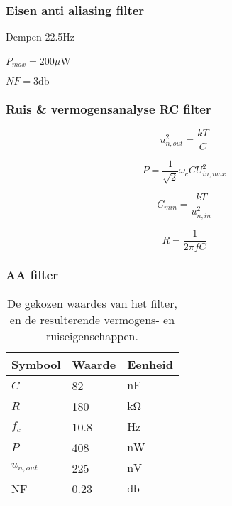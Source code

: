 
\begin{frame}
    \frametitle{Eisen anti aliasing filter}
    
    \centering
    \vspace{1cm}

    Dempen 22.5Hz


    $P_{max}=200\mu$W


    $NF=3\si{\decibel}$
    \vspace{2cm}


    \pause

    \begin{figure}
        \centering
        \def\svgwidth{0.4\textwidth}
        
    \end{figure}

\end{frame}
\begin{frame}
    \frametitle{Ruis \& vermogensanalyse RC filter}

    \begin{equation}\label{eq:dividerNoise}
        u_{n,out}^2 = \frac{kT}{C}
    \end{equation}

    \begin{equation} \label{eq:filterPower}
        P = \frac{1}{\sqrt{2}}\omega_cCU_{in,max}^2
    \end{equation}

    \pause

    \begin{equation} \label{eq:filterCapMin}
        C_{min} = \frac{kT}{u_{n,in}^2}
    \end{equation}

    \begin{equation}
        R = \frac{1}{2\pi fC}
    \end{equation}

\end{frame}
\begin{frame}
    \frametitle{AA filter}

    \begin{table}[ht]
        \centering
        \begin{tabular}{l|l|l}
            Symbool & Waarde & Eenheid \\
            \hline
            $C$         & 82    & $\si{\nano\farad}$\\
            $R$         & 180   & $\si{\kilo\ohm}$  \\
            $f_c$       & 10.8  & $\si{\hertz}$     \\
            $P$         & 408   & $\si{\nano\watt}$ \\
            $u_{n,out}$ & 225   & $\si{\nano\volt}$ \\
            NF          & 0.23  & $\si{\decibel}$   \\
        \end{tabular}
        \caption{De gekozen waardes van het filter, en de resulterende vermogens- en ruiseigenschappen.}
        \label{tab:filterValues}
    \end{table}

\end{frame}